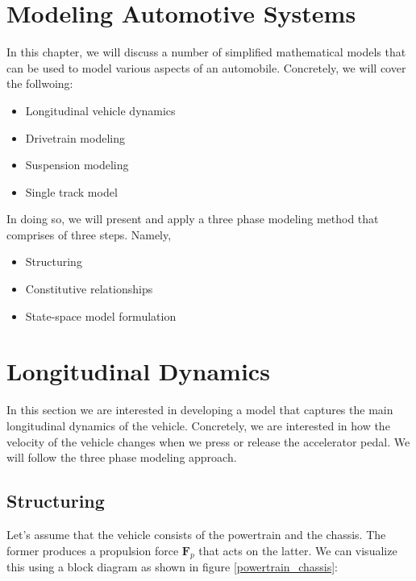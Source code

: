 \section{Modeling Automotive Systems}
\label{model_automotive_sys}
In this chapter, we will discuss a number of simplified mathematical models that can be used to model various aspects
of an automobile. Concretely, we will cover the follwoing:

\begin{itemize}
\item Longitudinal vehicle dynamics
\item Drivetrain modeling
\item Suspension modeling
\item Single track model
\end{itemize}

In doing so, we will present and apply a three phase modeling method that comprises of three steps. Namely,

\begin{itemize}
\item Structuring
\item Constitutive relationships
\item State-space model formulation
\end{itemize}
 

\section{Longitudinal Dynamics}
\label{longitudinal_dynamics}
In this section we are interested in developing a model that captures the main longitudinal dynamics of the vehicle. Concretely, we are interested in
how the velocity of the vehicle changes when we press or release the accelerator pedal. We will follow the three phase modeling approach. 

\subsection{Structuring}
Let's assume that the vehicle consists of the powertrain and the chassis. The former produces a propulsion force $\mathbf{F}_p$ that acts on the latter. We can visualize this 
using a block diagram as shown in figure \ref{powertrain_chassis}:

